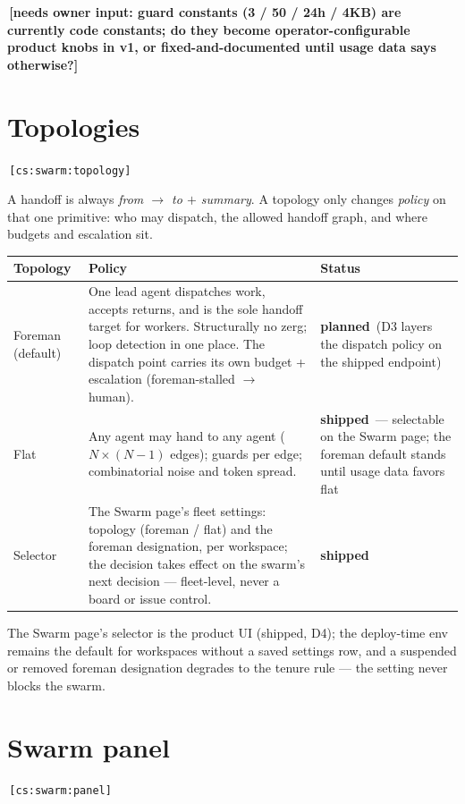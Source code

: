 \documentclass[11pt,a4paper]{report}
\newcommand{\cs}[1]{\,\texttt{\scriptsize[cs:#1]}\label{cs:#1}}
\newcommand{\shipped}{\textbf{\textcolor{green!45!black}{shipped}}}
\newcommand{\planned}{\textbf{\textcolor{blue!50!black}{planned}}}
\newcommand{\owner}[1]{\,\textcolor{red!60!black}{\textbf{[needs owner input: #1]}}}
\begin{document}
\owner{guard constants (3 / 50 / 24h / 4KB) are currently code
  constants; do they become operator-configurable product knobs in v1, or
  fixed-and-documented until usage data says otherwise?}

\section{Topologies}
\label{sec:topology}
\cs{swarm:topology}

A handoff is always \emph{from $\to$ to $+$ summary}. A topology only
changes \emph{policy} on that one primitive: who may dispatch, the allowed
handoff graph, and where budgets and escalation sit.

\begin{center}
\begin{tabular}{@{}p{}p{}p{}@{}}
\toprule
\textbf{Topology} & \textbf{Policy} & \textbf{Status}\\
\midrule
Foreman (default) & One lead agent dispatches work, accepts returns, and
  is the sole handoff target for workers. Structurally no zerg; loop
  detection in one place. The dispatch point carries its own budget +
  escalation (foreman-stalled $\to$ human). & \planned\ (D3 layers the
  dispatch policy on the shipped endpoint)\\
Flat & Any agent may hand to any agent ($N\times(N-1)$ edges); guards per
  edge; combinatorial noise and token spread. & \shipped\ --- selectable
  on the Swarm page; the foreman default stands until usage data favors
  flat\\
Selector & The Swarm page's fleet settings: topology (foreman / flat) and
  the foreman designation, per workspace; the decision takes effect on
  the swarm's next decision --- fleet-level, never a board or issue
  control. & \shipped\\
\bottomrule
\end{tabular}
\end{center}

The Swarm page's selector is the product UI (shipped, D4); the
deploy-time env remains the default for workspaces without a saved
settings row, and a suspended or removed foreman designation degrades
to the tenure rule --- the setting never blocks the swarm.

\section{Swarm panel}
\label{sec:panel}
\cs{swarm:panel}
\end{document}
